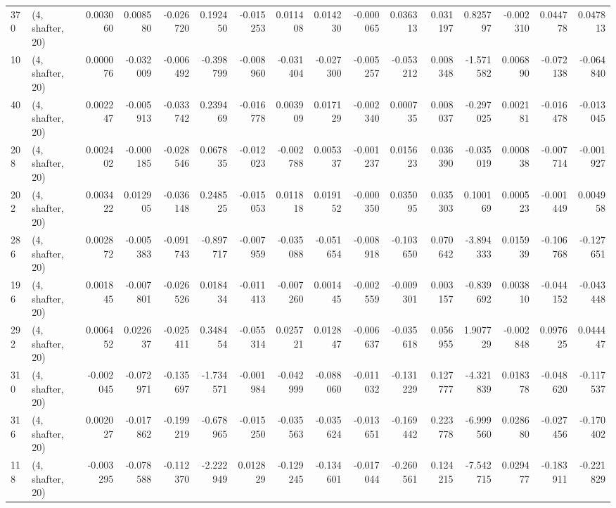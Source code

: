 \begin{tabular}{llrrrrrrrrrrrrrr}
370 &  (4, shafter, 20) &   0.003060 &  0.008580 & -0.026720 &    0.192450 & -0.015253 &   0.011408 &  0.014230 & -0.000065 &  0.036313 &  0.031197 &    0.825797 & -0.002310 &  0.044778 &  0.047813 \\
10  &  (4, shafter, 20) &   0.000076 & -0.032009 & -0.006492 &   -0.398799 & -0.008960 &  -0.031404 & -0.027300 & -0.005257 & -0.053212 &  0.008348 &   -1.571582 &  0.006890 & -0.072138 & -0.064840 \\
40  &  (4, shafter, 20) &   0.002247 & -0.005913 & -0.033742 &    0.239469 & -0.016778 &   0.003909 &  0.017129 & -0.002340 &  0.000735 &  0.008037 &   -0.297025 &  0.002181 & -0.016478 & -0.013045 \\
208 &  (4, shafter, 20) &   0.002402 & -0.000185 & -0.028546 &    0.067835 & -0.012023 &  -0.002788 &  0.005337 & -0.001237 &  0.015623 &  0.036390 &   -0.035019 &  0.000838 & -0.007714 & -0.001927 \\
202 &  (4, shafter, 20) &   0.003422 &  0.012905 & -0.036148 &    0.248525 & -0.015053 &   0.011818 &  0.019152 & -0.000350 &  0.035095 &  0.035303 &    0.100169 &  0.000523 & -0.001449 &  0.004958 \\
286 &  (4, shafter, 20) &   0.002872 & -0.005383 & -0.091743 &   -0.897717 & -0.007959 &  -0.035088 & -0.051654 & -0.008918 & -0.103650 &  0.070642 &   -3.894333 &  0.015939 & -0.106768 & -0.127651 \\
196 &  (4, shafter, 20) &   0.001845 & -0.007801 & -0.026526 &    0.018434 & -0.011413 &  -0.007260 &  0.001445 & -0.002559 & -0.009301 &  0.003157 &   -0.839692 &  0.003810 & -0.044152 & -0.043448 \\
292 &  (4, shafter, 20) &   0.006452 &  0.022637 & -0.025411 &    0.348454 & -0.055314 &   0.025721 &  0.012847 & -0.006637 & -0.035618 &  0.056955 &    1.907729 & -0.002848 &  0.097625 &  0.044447 \\
310 &  (4, shafter, 20) &  -0.002045 & -0.072971 & -0.135697 &   -1.734571 & -0.001984 &  -0.042999 & -0.088060 & -0.011032 & -0.131229 &  0.127777 &   -4.321839 &  0.018378 & -0.048620 & -0.117537 \\
316 &  (4, shafter, 20) &   0.002027 & -0.017862 & -0.199219 &   -0.678965 & -0.015250 &  -0.035563 & -0.035624 & -0.013651 & -0.169442 &  0.223778 &   -6.999560 &  0.028680 & -0.027456 & -0.170402 \\
118 &  (4, shafter, 20) &  -0.003295 & -0.078588 & -0.112370 &   -2.222949 &  0.012829 &  -0.129245 & -0.134601 & -0.017044 & -0.260561 &  0.124215 &   -7.542715 &  0.029477 & -0.183911 & -0.221829 \\

\end{tabular}
